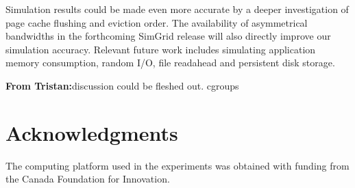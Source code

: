 \documentclass[conference]{IEEEtran}
\newcommand{\tristan}[1]{\color{orange}\textbf{From Tristan:}#1\color{black}}
\newcommand{\simgrid}{SimGrid\xspace}
\begin{document}
        Simulation results could be made even more accurate by a deeper
        investigation of page cache flushing and eviction order. 
        The availability of asymmetrical bandwidths in the
        forthcoming \simgrid release will also directly improve our
        simulation accuracy. Relevant future work includes simulating
        application memory consumption, random I/O, file readahead and
        persistent disk storage.

        \tristan{discussion could be fleshed out. cgroups}

        \section{Acknowledgments}
The computing platform used in the experiments was obtained with funding
from the Canada Foundation for Innovation.



\end{document}
